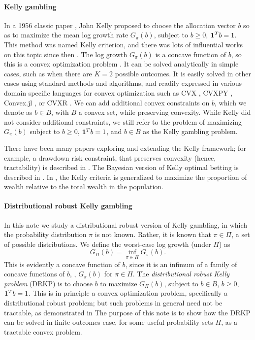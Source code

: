 \documentclass[12pt]{article}
\begin{document}
\paragraph{Kelly gambling}
In a 1956 classic paper
\cite{kelly1956new},
John Kelly proposed to choose the allocation vector $b$ so as to
maximize the mean log growth rate $G_\pi(b)$,
subject to $b \geq 0$, $\mathbf 1^Tb=1$. This method was named Kelly criterion, and there was lots of influential works on this topic since then \cite{maclean2011kelly, thorp1975portfolio, davis2012fractional,maclean2010long, thorp2011understanding, kadane2011partial}.
The log growth $G_\pi(b)$ is a concave function of $b$,
so this is a convex optimization problem \cite{cvxopt,boyd2004convex}.
It can be solved analytically
in simple cases, such as when there are $K=2$ possible outcomes.
It is easily solved in other cases using standard methods and algorithms,
and readily expressed in various domain specific languages for 
convex optimization such as
CVX \cite{cvx}, CVXPY \cite{cvxpy}, Convex.jl \cite{convexjl}, or CVXR \cite{fu2017cvxr}.
We can add additional convex constraints on $b$, which we denote as $b\in B$,
with $B$ a convex set, while preserving convexity.
While Kelly did not consider additional constraints, we still refer
to the problem of maximizing $G_\pi(b)$ subject to 
$b \geq 0$, $\mathbf 1^Tb=1$, and $b\in B$ as the Kelly gambling problem.

There have been many papers exploring and extending the Kelly framework;
for example, a drawdown risk constraint, that preserves convexity
(hence, tractability) is described in \cite{busseti2016risk}. The Bayesian version of Kelly optimal betting is  described in \cite{browne1996portfolio}. In \cite{lo2018growth}, the Kelly criteria is generalized to maximize the proportion of wealth relative to the total wealth in the population.
 
\paragraph{Distributional robust Kelly gambling}
In this note we study a distributional robust version of Kelly gambling,
in which the probability distribution $\pi$ is not known.  
Rather, it is known that $\pi \in \Pi$, a set of possible distributions.
We define the worst-case log growth (under $\Pi$) as 
\[
G_\Pi (b) = \inf_{\pi \in \Pi} G_\pi(b).
\]
This is evidently a concave function of $b$, since it is an infimum of 
a family of concave functions of $b$, \ie, $G_\pi(b)$ for $\pi \in \Pi$.
The \emph{distributional robust Kelly problem} (DRKP) is to choose $b$ to maximize
$G_\Pi (b)$, subject to $b \in B$, $b\geq 0$, $\mathbf 1^Tb=1$.
This is in principle a convex optimization problem, specifically a 
distributional robust problem; but such problems in general need not
be tractable, as demonstrated in \cite{nemirovski2009robust,nemirovski1978,nemirovski1983}
The purpose of this note is to show how the DRKP
can be solved in finite outcomes case, for some useful probability sets $\Pi$, 
as a tractable convex problem.
\end{document}

